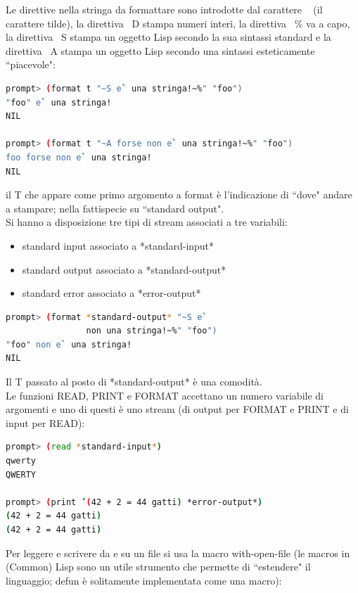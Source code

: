 \documentclass[a4paper,12pt, oneside]{book}
\begin{document}
Le direttive nella stringa da formattare sono introdotte
dal carattere ~ (il carattere tilde), la direttiva ~D stampa numeri interi, la direttiva ~\% va a capo, la direttiva ~S stampa un oggetto Lisp secondo la sua sintassi
standard e la direttiva ~A stampa un oggetto Lisp secondo una sintassi esteticamente “piacevole":
\begin{shaded}
\begin{lstlisting}[language=bash]
prompt> (format t "~S e` una stringa!~%" "foo")
"foo" e` una stringa!
NIL

prompt> (format t "~A forse non e` una stringa!~%" "foo")
foo forse non e` una stringa!
NIL
\end{lstlisting}
\end{shaded}
il T che appare come primo argomento a format è l’indicazione di “dove" andare a stampare; nella fattispecie su
“standard output".\\
Si hanno a disposizione tre tipi di stream associati a tre variabili:
\begin{itemize}
\item standard input associato a *standard-input*
\item standard output associato a *standard-output*
\item standard error associato a *error-output*
\end{itemize}
\begin{shaded}
\begin{lstlisting}[language=bash]
prompt> (format *standard-output* "~S e` 
                non una stringa!~%" "foo")
"foo" non e` una stringa!
NIL
\end{lstlisting}
\end{shaded}
Il T passato al posto di *standard-output* è una comodità.\\
Le funzioni READ, PRINT e FORMAT accettano un numero variabile di argomenti e uno di questi è uno stream (di output per FORMAT e PRINT e di input per
READ):
\begin{shaded}
\begin{lstlisting}[language=bash]
prompt> (read *standard-input*)
qwerty
QWERTY

prompt> (print ’(42 + 2 = 44 gatti) *error-output*)
(42 + 2 = 44 gatti)
(42 + 2 = 44 gatti)
\end{lstlisting}
\end{shaded}
Per leggere e scrivere da e su un file si usa
la macro with-open-file (le macros in (Common) Lisp sono un utile strumento che permette di “estendere" il
linguaggio; defun è solitamente implementata come una macro):
\end{document}
